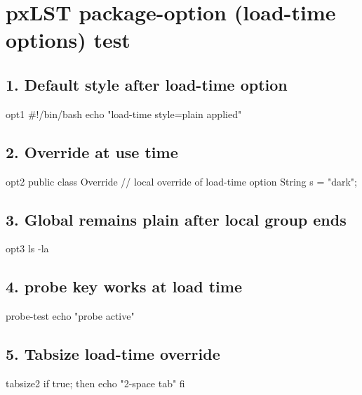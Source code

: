 \documentclass{article}
\begin{document}
\section*{pxLST package-option (load-time options) test}

\subsection*{1. Default style after load-time option}
\begin{pxCode}{opt1}
#!/bin/bash
echo "load-time style=plain applied"
\end{pxCode}

\subsection*{2. Override at use time}
\begin{pxCode}[style=dark, language=pxJava, numbers=left]{opt2}
public class Override {
    // local override of load-time option
    String s = "dark";
}
\end{pxCode}

\subsection*{3. Global remains plain after local group ends}
\begin{pxCode}{opt3}
ls -la
\end{pxCode}

\subsection*{4. probe key works at load time}
\begin{pxCode}{probe-test}
echo "probe active"
\end{pxCode}

\subsection*{5. Tabsize load-time override}
\begin{pxCode}{tabsize2}
if true; then
	echo "2-space tab"
fi
\end{pxCode}
\end{document}
